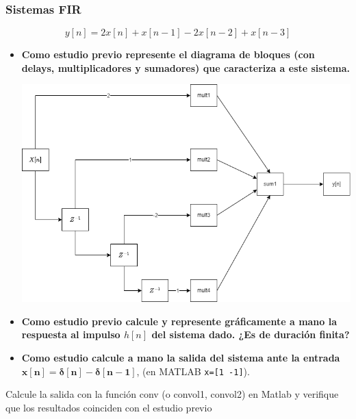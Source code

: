 \documentclass[12pt]{article}
\begin{document}
\subsubsection*{Sistemas FIR}
\[ y[n]=2x[n]+x[n-1]-2x[n-2]+x[n-3] \]
\begin{itemize}
	\item \textbf{Como estudio previo represente el diagrama de bloques (con delays, multiplicadores y sumadores) que caracteriza a este sistema.}
	
	\begin{center}
		\includegraphics[width=\linewidth]{Imágenes/screenshoot001.drawio}
	\end{center}
	
	\item \textbf{Como estudio previo calcule y represente gráficamente a mano la respuesta al impulso $h[n]$ del sistema dado. ¿Es de duración finita?}
	
	
	\item \textbf{Como estudio calcule a mano la salida del sistema ante la entrada $\mathbf{x[n]=\delta[n]-\delta[n-1]}$}, (en MATLAB \texttt{x=[1 -1]}).
\end{itemize}
Calcule la salida con la función conv (o convol1, convol2) en Matlab y verifique que los
resultados coinciden con el estudio previo
\end{document}
